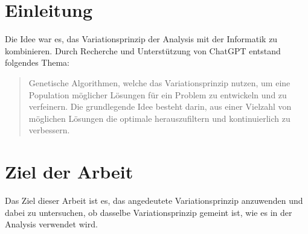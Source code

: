 %
%
%
%
\section{Einleitung
\label{buch:paper:section:introduction}}
Die Idee war es, das Variationsprinzip der Analysis mit der Informatik zu kombinieren. 
Durch Recherche und Unterstützung von ChatGPT entstand folgendes Thema:

\begin{quote}
    Genetische Algorithmen, welche das Variationsprinzip nutzen, um eine Population 
    möglicher Lösungen für ein Problem zu entwickeln und zu verfeinern. 
    Die grundlegende Idee besteht darin, aus einer Vielzahl von möglichen Lösungen 
    die optimale herauszufiltern und kontinuierlich zu verbessern.
\end{quote}

\section{Ziel der Arbeit
\label{buch:paper:varalg:section:goal}} 
Das Ziel dieser Arbeit ist es, das angedeutete Variationsprinzip anzuwenden und dabei 
zu untersuchen, ob dasselbe Variationsprinzip gemeint ist, wie es in der Analysis 
verwendet wird.
